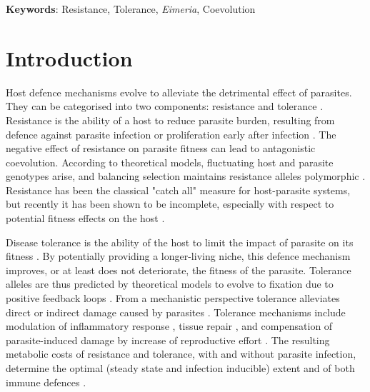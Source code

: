 \textbf{Keywords}: Resistance, Tolerance, \textit{Eimeria}, Coevolution

\section{Introduction}

Host defence mechanisms evolve to alleviate the detrimental effect of parasites. They can be categorised into two components: resistance and tolerance \citep{raaberg_decomposing_2009}. Resistance is the ability of a host to reduce parasite burden, resulting from defence against parasite infection or proliferation early after infection \citep{schmid-hempel_evolutionary_2013}. The negative effect of resistance on parasite fitness can lead to antagonistic coevolution. According to theoretical models, fluctuating host and parasite genotypes arise, and balancing selection maintains resistance alleles polymorphic \citep{Boots2008, roy_evolutionary_2000}. Resistance has been the classical "catch all" measure for host-parasite systems, but recently it has been shown to be incomplete, especially with respect to potential fitness effects on the host \citep{kutzer_maximising_2016, raaberg_decomposing_2009}.\par

Disease tolerance \parencite[not to be confused from "immunological tolerance", unresponsiveness to self antigens;][]{medzhitov_disease_2012} is the ability of the host to limit the impact of parasite on its fitness \citep{raaberg_decomposing_2009, Vale2012, kutzer_maximising_2016}. By potentially providing a longer-living niche, this defence mechanism improves, or at least does not deteriorate, the fitness of the parasite. Tolerance alleles are thus predicted by theoretical models to evolve to fixation due to positive feedback loops \citep{Boots2008, restif_concurrent_2004, roy_evolutionary_2000}. From a mechanistic perspective tolerance alleviates direct or indirect damage \parencite[e.g. excessive immune response underlying resistance against parasites, called immunopathology;][]{graham_evolutionary_2005} caused by parasites \citep{raaberg_decomposing_2009}. Tolerance mechanisms include modulation of inflammatory response \citep{Ayres2012}, tissue repair \parencite[stress response, damage repair and cellular regeneration mechanisms;][]{soares_disease_2017}, and compensation of parasite-induced damage by increase of reproductive effort \citep{Baucom2011}. The resulting metabolic costs of resistance and tolerance, with and without parasite infection, determine the optimal (steady state and infection inducible) extent and of both immune defences \citep{sheldon_ecological_1996}.\par

